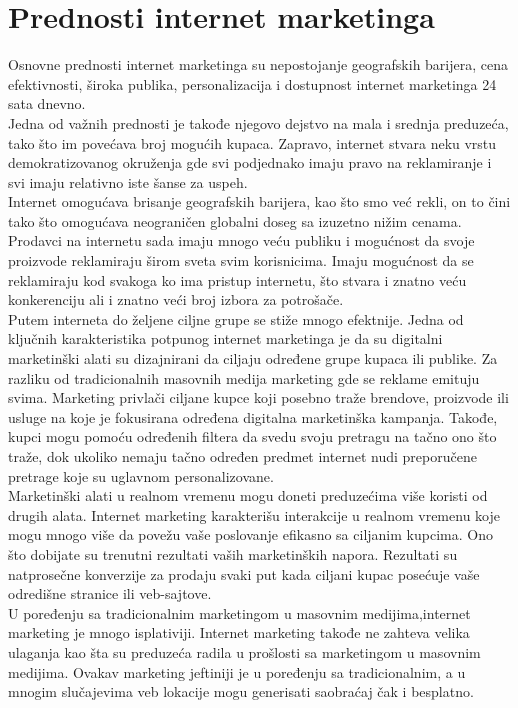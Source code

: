 \documentclass[a4paper]{article}
\begin{document}
{\section{Prednosti internet marketinga}
\label{sec:prednosti}
Osnovne prednosti internet marketinga su nepostojanje geografskih barijera, cena efektivnosti, široka publika, personalizacija i dostupnost internet marketinga 24 sata dnevno.
\\Jedna od važnih prednosti je takođe njegovo dejstvo na mala i srednja preduzeća, tako što im povećava broj mogućih kupaca. Zapravo, internet stvara neku vrstu demokratizovanog okruženja gde svi podjednako imaju pravo na reklamiranje i svi imaju relativno iste šanse za uspeh.
\\Internet omogućava brisanje geografskih barijera, kao što smo već rekli, on to čini tako što omogućava neograničen globalni doseg sa izuzetno nižim cenama. Prodavci na internetu sada imaju mnogo veću publiku i mogućnost da svoje proizvode reklamiraju širom sveta svim korisnicima. Imaju mogućnost da se reklamiraju kod svakoga ko ima pristup internetu, što stvara i znatno veću konkerenciju ali i znatno veći broj izbora za potrošače.
\\Putem interneta do željene ciljne grupe se stiže mnogo efektnije.
Jedna od ključnih karakteristika potpunog internet marketinga je da su digitalni marketinški alati su dizajnirani da ciljaju određene grupe kupaca ili publike. Za razliku od tradicionalnih masovnih medija marketing gde se reklame emituju svima. Marketing privlači ciljane kupce koji posebno traže brendove, proizvode ili usluge na koje je fokusirana određena digitalna marketinška kampanja. Takođe, kupci mogu pomoću određenih filtera da svedu svoju pretragu na tačno ono što traže, dok ukoliko nemaju tačno određen predmet internet nudi preporučene pretrage koje su uglavnom personalizovane.
\\Marketinški alati u realnom vremenu mogu doneti preduzećima više koristi od drugih alata. Internet marketing karakterišu interakcije u realnom vremenu koje mogu mnogo više da povežu vaše poslovanje
efikasno sa ciljanim kupcima. Ono što dobijate su trenutni rezultati vaših marketinških napora. Rezultati su natprosečne konverzije za prodaju svaki put kada ciljani kupac posećuje vaše odredišne stranice ili veb-sajtove.
\\U poređenju sa tradicionalnim marketingom u masovnim medijima,internet marketing je mnogo isplativiji. Internet marketing takođe ne zahteva  velika ulaganja kao šta su preduzeća radila u prošlosti sa marketingom u masovnim medijima. Ovakav marketing jeftiniji je u poređenju sa tradicionalnim, a u mnogim slučajevima veb lokacije mogu generisati saobraćaj čak i besplatno.\cite{prednosti i mane}
}
\end{document}
